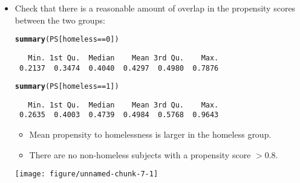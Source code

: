 \documentclass[oneside]{book}\usepackage[]{graphicx}\usepackage[svgnames]{xcolor}
\makeatletter
\def\maxwidth{ %
  \ifdim\Gin@nat@width>\linewidth
    \linewidth
  \else
    \Gin@nat@width
  \fi
}
\newcommand{\hlnum}[1]{\textcolor[rgb]{0.686,0.059,0.569}{#1}}%
\newcommand{\hlopt}[1]{\textcolor[rgb]{0,0,0}{#1}}%
\newcommand{\hlstd}[1]{\textcolor[rgb]{0.345,0.345,0.345}{#1}}%
\newcommand{\hlkwd}[1]{\textcolor[rgb]{0.737,0.353,0.396}{\textbf{#1}}}%
\newenvironment{kframe}{%
 \def\at@end@of@kframe{}%
 \ifinner\ifhmode%
  \def\at@end@of@kframe{\end{minipage}}%
  \begin{minipage}{\columnwidth}%
 \fi\fi%
 \def\FrameCommand##1{\hskip\@totalleftmargin \hskip-\fboxsep
 \colorbox{shadecolor}{##1}\hskip-\fboxsep
     \hskip-\linewidth \hskip-\@totalleftmargin \hskip\columnwidth}%
 \MakeFramed {\advance\hsize-\width
   \@totalleftmargin\z@ \linewidth\hsize
   \@setminipage}}%
 {\par\unskip\endMakeFramed%
 \at@end@of@kframe}
\newenvironment{knitrout}{}{} %
\makeatother
\begin{document}
\begin{itemize}
\begin{knitrout}
\begin{kframe}
\end{kframe}
\end{knitrout}
      \item Check that there is a reasonable amount of overlap in the
            propensity scores between the two groups:
\begin{knitrout}
\color{fgcolor}\begin{kframe}
\begin{alltt}
\hlkwd{summary}\hlstd{(PS[homeless} \hlopt{==} \hlnum{0}\hlstd{])}
\end{alltt}
\begin{verbatim}
   Min. 1st Qu.  Median    Mean 3rd Qu.    Max. 
 0.2137  0.3474  0.4040  0.4297  0.4980  0.7876 
\end{verbatim}
\begin{alltt}
\hlkwd{summary}\hlstd{(PS[homeless} \hlopt{==} \hlnum{1}\hlstd{])}
\end{alltt}
\begin{verbatim}
   Min. 1st Qu.  Median    Mean 3rd Qu.    Max. 
 0.2635  0.4003  0.4739  0.4984  0.5768  0.9643 
\end{verbatim}
\end{kframe}
\end{knitrout}
            \begin{itemize}
                  \item Mean propensity to homelessness is larger in the homeless
                        group.
                  \item There are no non-homeless subjects with a propensity score
                        $> 0.8$.
            \end{itemize}
\begin{knitrout}
\color{fgcolor}

{\centering \texttt{[image: figure/unnamed-chunk-7-1]} 

}


\end{knitrout}
\end{itemize}
\end{document}
